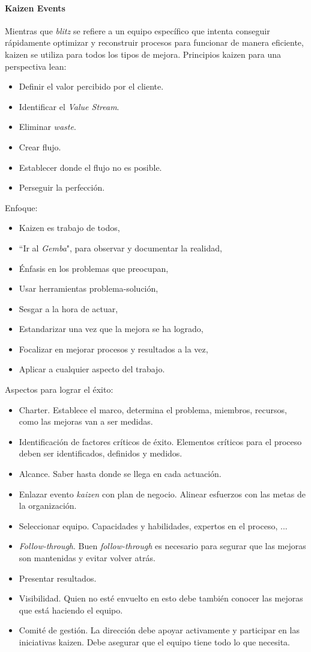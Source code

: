 \documentclass[oneside]{book}
\begin{document}
\paragraph{Kaizen Events}
Mientras que \textit{blitz} se refiere a un equipo específico que intenta conseguir rápidamente optimizar y reconstruir procesos para funcionar de manera eficiente, kaizen se utiliza para todos los tipos de mejora. Principios kaizen para una perspectiva lean:
\begin{itemize}
	\item Definir el valor percibido por el cliente.
	\item Identificar el \textit{Value Stream}.
	\item Eliminar \textit{waste}.
	\item Crear flujo.
	\item Establecer donde el flujo no es posible.
	\item Perseguir la perfección.
\end{itemize}
Enfoque:
\begin{itemize}
	\item Kaizen es trabajo de todos,
	\item ``Ir al \textit{Gemba}", para observar y documentar la realidad,
	\item Énfasis en los problemas que preocupan,
	\item Usar herramientas problema-solución,
	\item Sesgar a la hora de actuar,
	\item Estandarizar una vez que la mejora se ha logrado,
	\item Focalizar en mejorar procesos y resultados a la vez,
	\item Aplicar a cualquier aspecto del trabajo.
\end{itemize}
Aspectos para lograr el éxito:
\begin{itemize}
	\item Charter. Establece el marco, determina el problema, miembros, recursos, como las mejoras van a ser medidas.
	\item Identificación de factores críticos de éxito. Elementos críticos para el proceso deben ser identificados, definidos y medidos.
	\item Alcance. Saber hasta donde se llega en cada actuación.
	\item Enlazar evento \textit{kaizen} con plan de negocio. Alinear esfuerzos con las metas de la organización.
	\item Seleccionar equipo. Capacidades y habilidades, expertos en el proceso, ...
	\item \textit{Follow-through}. Buen \textit{follow-through} es necesario para segurar que las mejoras son mantenidas y evitar volver atrás.
	\item Presentar resultados. 
	\item Visibilidad. Quien no esté envuelto en esto debe también conocer las mejoras que está haciendo el equipo.
	\item Comité de gestión. La dirección debe apoyar activamente y participar en las iniciativas kaizen. Debe asegurar que el equipo tiene todo lo que necesita.
\end{itemize}
\end{document}

